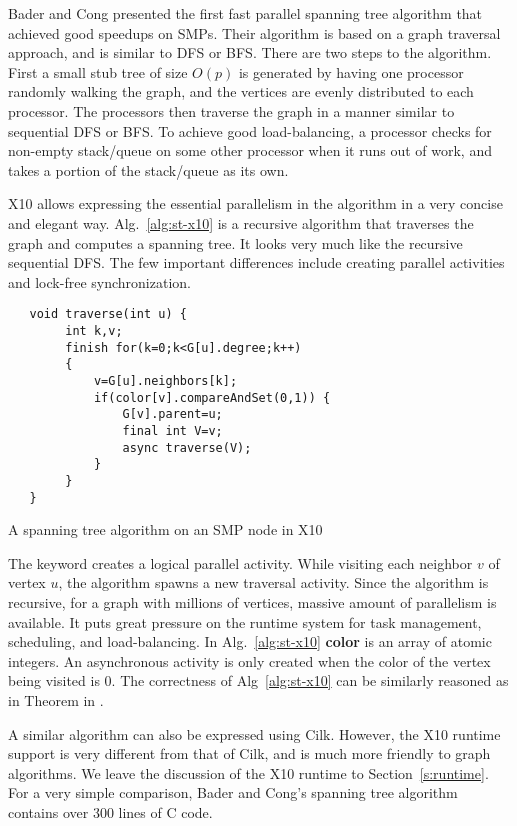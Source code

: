 Bader and Cong \cite{BC04} presented the first fast parallel spanning tree algorithm that achieved good 
speedups on SMPs. Their algorithm is based on a graph traversal approach, and is similar to DFS or BFS. 
There are two steps to the algorithm. First a small stub tree of size $O(p)$ is generated by having one processor randomly walking the graph, and the vertices are evenly distributed to each processor.
The processors then traverse the graph in a manner similar to sequential DFS or BFS. 
To achieve good load-balancing, a processor checks for non-empty stack/queue on some other processor when it runs out of work, and takes a portion of the stack/queue as its own.

X10 allows expressing the essential parallelism in the algorithm in a very concise and elegant way. Alg.~\ref{alg:st-x10} is a recursive algorithm that traverses the graph and computes a spanning tree. It looks very much like the recursive sequential DFS. The few important differences include creating parallel activities and lock-free synchronization.  
\begin{algorithm}
\begin{verbatim} 
   void traverse(int u) {
        int k,v;
        finish for(k=0;k<G[u].degree;k++)
        {
            v=G[u].neighbors[k];
            if(color[v].compareAndSet(0,1)) {
                G[v].parent=u;
                final int V=v;
                async traverse(V);
            }
        }
   }
\end{verbatim}
\caption{A spanning tree algorithm on an SMP node in X10}
\label{alg:st-x10}
\end{algorithm}

The \async keyword creates a logical parallel activity. While visiting each neighbor $v$ of vertex $u$, the algorithm spawns a new traversal activity. Since the algorithm is recursive, for a graph with millions of vertices, massive amount of parallelism is available. It puts great pressure on the runtime system for task management, scheduling, and load-balancing. In Alg.~\ref{alg:st-x10} \textbf{color} is an array of atomic integers. An asynchronous activity is only created when the color of the vertex being visited is 0. The correctness of Alg~\ref{alg:st-x10} can be similarly reasoned as in Theorem in \cite{BC04}. 

A similar algorithm can also be expressed using Cilk. However, the X10 runtime support is very different from that of Cilk, and is much more friendly to graph algorithms. We leave the discussion of the X10 runtime to Section~\ref{s:runtime}. For a very simple comparison, Bader and Cong's spanning tree algorithm contains over 300 lines of C code.


